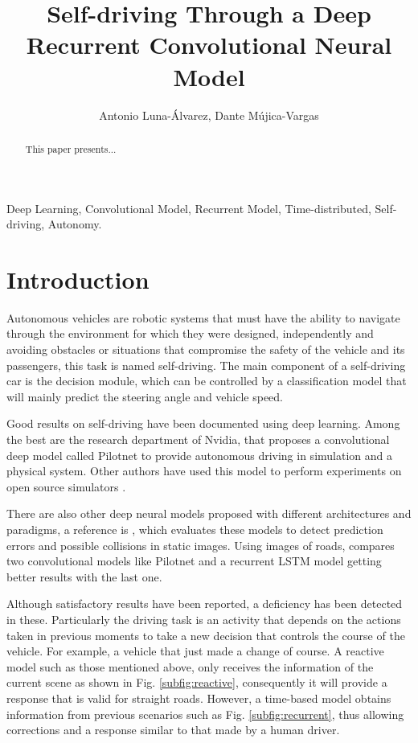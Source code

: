 \documentclass{cys}
\title{Self-driving	Through a Deep Recurrent Convolutional Neural Model}
\author{Antonio Luna-Álvarez, Dante Mújica-Vargas}
\affil{ 
Tecnológico Nacional de México CENIDET, Departament of Computer Sciences , Cuernavaca, \authorcr   %
México             
\authorcr  \authorcr
jesus.luna18ce@cenidet.edu.mx, dantemv@cenidet.edu.mx
\authorcr  \authorcr
}
\begin{document}
\maketitle

\renewcommand{\tablename}{Table}

\begin{abstract}
This paper presents...
\end{abstract}

\begin{keywords} 
Deep Learning, Convolutional Model, Recurrent Model, Time-distributed, Self-driving, Autonomy.
\end{keywords} 


\section{Introduction}
\label{sec:introduction}
Autonomous vehicles are robotic systems that must have the ability to navigate through the environment for which they were designed, independently and avoiding obstacles or situations that compromise the safety of the vehicle and its passengers, this task is named self-driving. The main component of a self-driving car is the decision module, which can be controlled by a classification model that will mainly predict the steering angle and vehicle speed.


Good results on self-driving have been documented using deep learning. Among the best are the research department of Nvidia, that proposes a convolutional deep model called Pilotnet \cite{bojarski2016end}\cite{bojarski2017explaining} to provide autonomous driving in simulation and a physical system. Other authors have used this model to perform experiments on open source simulators \cite {alexeev2018end}.

There are also other deep neural models proposed with different architectures and paradigms, a reference is \cite{tian2018deeptest}, which evaluates these models to detect prediction errors and possible collisions in static images. Using images of roads, compares two convolutional models like Pilotnet and a recurrent LSTM model getting better results with the last one.


Although satisfactory results have been reported, a deficiency has been detected in these. Particularly the driving task is an activity that depends on the actions taken in previous moments to take a new decision that controls the course of the vehicle. For example, a vehicle that just made a change of course. A reactive model such as those mentioned above, only receives the information of the current scene as shown in Fig. \ref{subfig:reactive}, consequently it will provide a response that is valid for straight roads. However, a time-based model obtains information from previous scenarios such as Fig. \ref{subfig:recurrent}, thus allowing corrections and a response similar to that made by a human driver.
\end{document}

